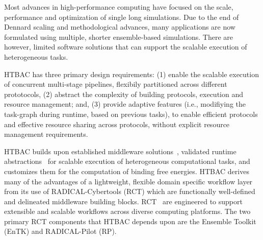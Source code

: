 
Most advances in high-performance computing have focused on the scale,
performance and optimization of single long simulations. Due to the end of
Dennard scaling and methodological advances, many applications are now
formulated using multiple, shorter ensemble-based simulations. There are
however, limited software solutions that can support the scalable execution of
heterogeneous tasks.

HTBAC has three primary design requirements\@: (1) enable the scalable
execution of concurrent multi-stage pipelines, flexibily partitioned across
different prototocols, (2) abstract the complexity of building protocols,
execution and resource management; and, (3) provide adaptive features (i.e.,
modifiying the task-graph during runtime, based on previous tasks), to enable
efficient protocols and effective resource sharing across protocols, without
explicit resource management requirements.



HTBAC builds upon established middleware solutions~\cite{review_bb_2016},
validated runtime abstractions~\cite{turilli2017comprehensive} for scalable
execution of heterogeneous computational tasks, and customizes them for the
computation of binding free energies. HTBAC derives many of the advantages of
a lightweight, flexible domain specific workflow layer from its use of
RADICAL-Cybertools (RCT) which are functionally well-defined and delineated
middleware building blocks. RCT~\cite{review_bb_2016} are engineered to
support extensible and scalable workflows across diverse computing platforms.
The two primary RCT components that HTBAC depends upon are the Ensemble
Toolkit (EnTK) and RADICAL-Pilot (RP). 


